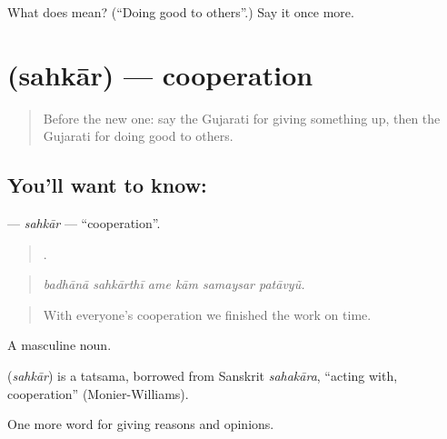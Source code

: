 \begin{tcolorbox}[breakable,colback=teal!4,colframe=teal!35!black,title={Before you move on}]
What does  mean? (\textquotedblleft{}Doing good to others\textquotedblright{}.) Say it once more.
\end{tcolorbox}
\section[\texorpdfstring{\gu{સહકાર} (sahkār)}{સહકાર (sahkār)}]{ (sahkār) — cooperation}

\label{lesson:GU-C358-sahkar}



\begin{quote}
Before the new one: say the Gujarati for giving something up, then the Gujarati for doing good to others.
\end{quote}

\subsection*{You'll want to know: }
\textbf{} — \emph{sahkār} — \textquotedblleft{}cooperation\textquotedblright{}.

\begin{quote}
     .
\end{quote}

\begin{quote}
\emph{badhānā sahkārthī ame kām samaysar patāvyũ.}
\end{quote}

\begin{quote}
With everyone's cooperation we finished the work on time.
\end{quote}

A masculine noun.

\begin{cousinweb}
\textbf{} (\emph{sahkār}) is a tatsama, borrowed from Sanskrit \emph{sahakāra}, \textquotedblleft{}acting with, cooperation\textquotedblright{} (Monier-Williams).
\end{cousinweb}

\begin{grammarlens}[title={What you've built}]
One more word for giving reasons and opinions.
\end{grammarlens}

